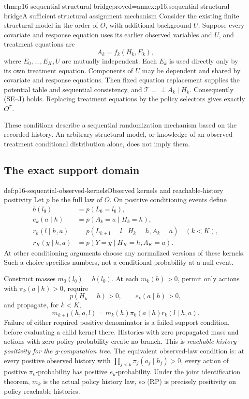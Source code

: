 \begin{hbtheorem}{thm:p16-sequential-structural-bridge}{proved=annex:p16.sequential-structural-bridge}{A sufficient structural assignment mechanism}
Consider the existing finite structural model in the order of \(O\), with
additional background \(U\). Suppose every covariate and response equation
uses its earlier observed variables and \(U\), and treatment equations are
\[
 A_k=f_k(H_k,E_k),
\]
where \(E_0,\ldots,E_K,U\) are mutually independent. Each \(E_k\)
is used directly only by its own treatment equation. Components of \(U\)
may be dependent and shared by covariate and response equations.
Then fixed equation replacement supplies the potential table and sequential
consistency, and
\(\mathcal T\mathrel{\perp\!\!\!\perp} A_k\mid H_k\).
Consequently (SE--J) holds. Replacing treatment equations by the policy
selectors gives exactly \(O^\pi\).

These conditions describe a sequential randomization mechanism based on
the recorded history. An arbitrary structural model, or knowledge of an
observed treatment conditional distribution alone, does not imply them.
\end{hbtheorem}

\subsection{The exact support domain}

\begin{hbdefinition}{def:p16-sequential-observed-kernels}{Observed kernels and reachable-history positivity}
Let \(p\) be the full law of \(O\). On positive conditioning events define
\[
\begin{aligned}
 b(l_0)&=p(L_0=l_0),\\
 e_k(a\mid h)&=p(A_k=a\mid H_k=h),\\
 r_k(l\mid h,a)&=p(L_{k+1}=l\mid H_k=h,A_k=a)\quad(k<K),\\
 r_K(y\mid h,a)&=p(Y=y\mid H_K=h,A_K=a).
\end{aligned}
\]
At other conditioning arguments choose any normalized versions of these
kernels. Such a choice specifies numbers, not a conditional probability
at a null event.

Construct masses \(m_0(l_0)=b(l_0)\). At each \(m_k(h)>0\), permit
only actions with \(\pi_k(a\mid h)>0\), require
\[
 p(H_k=h)>0,\qquad e_k(a\mid h)>0,                 \tag{RP}
\]
and propagate, for \(k<K\),
\[
 m_{k+1}(h,a,l)=m_k(h)\pi_k(a\mid h)r_k(l\mid h,a).
\]
Failure of either required positive denominator is a failed support
condition, before evaluating a child kernel there. Histories with zero
propagated mass and actions with zero policy probability create no branch.
This is \emph{reachable-history positivity for the g-computation tree}.
The equivalent observed-law condition is: at every positive observed
history with \(\prod_{j<k}\pi_j(a_j\mid h_j)>0\), every action of positive
\(\pi_k\)-probability has positive \(e_k\)-probability.
Under the joint identification theorem, \(m_k\) is the actual policy
history law, so (RP) is precisely positivity on policy-reachable histories.
\end{hbdefinition}

